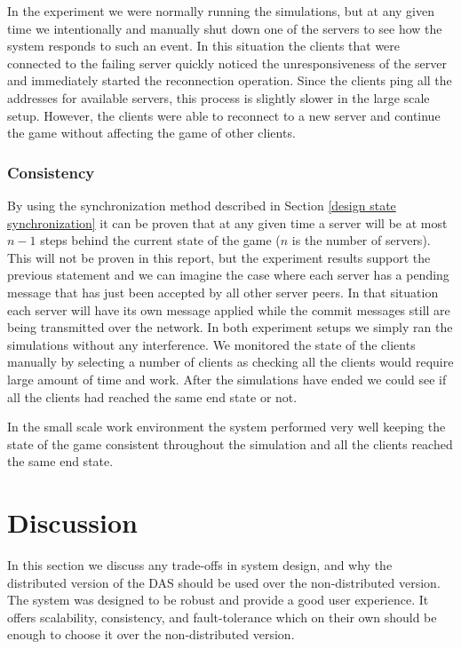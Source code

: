 \documentclass[a4paper]{article}
\begin{document}
In the experiment we were normally running the simulations, but at any given time we intentionally and manually shut down one of the servers to see how the system responds to such an event. In this situation the clients that were connected to the failing server quickly noticed the unresponsiveness of the server and immediately started the reconnection operation. Since the clients ping all the addresses for available servers, this process is slightly slower in the large scale setup. However, the clients were able to reconnect to a new server and continue the game without affecting the game of other clients.

\subsubsection{Consistency}
By using the synchronization method described in Section \ref{design state synchronization} it can be proven that at any given time a server will be at most $n-1$ steps behind the current state of the game ($n$ is the number of servers). This will not be proven in this report, but the experiment results support the previous statement and we can imagine the case where each server has a pending message that has just been accepted by all other server peers. In that situation each server will have its own message applied while the commit messages still are being transmitted over the network. In both experiment setups we simply ran the simulations without any interference. We monitored the state of the clients manually by selecting a number of clients as checking all the clients would require large amount of time and work. After the simulations have ended we could see if all the clients had reached the same end state or not.

In the small scale work environment the system performed very well keeping the state of the game consistent throughout the simulation and all the clients reached the same end state. 



\section{Discussion}
In this section we discuss any trade-offs in system design, and why the distributed version of the DAS should be used over the non-distributed version. The system was designed to be robust and provide a good user experience. It offers scalability, consistency, and fault-tolerance which on their own should be enough to choose it over the non-distributed version. 
\end{document}
